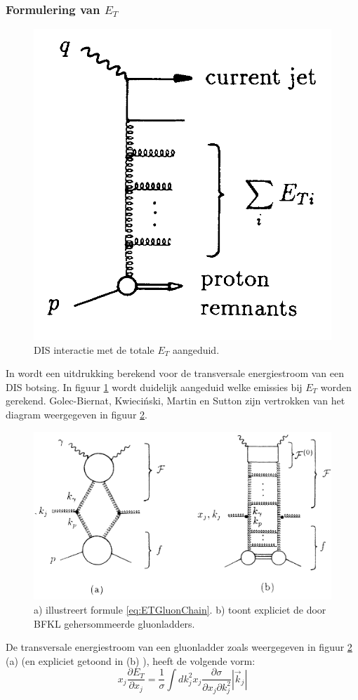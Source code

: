 \documentclass[a4paper,11pt]{article}
\numberwithin{equation}{section} %
\begin{document}
    \subsubsection{Formulering van $E_T$}
\begin{figure} [H]
  \begin{center}
    \includegraphics[width=.33\textwidth]{Afbeeldingen/ETDefinitionDiagram.png}
    \caption{DIS interactie met de totale $E_T$ aangeduid. \cite{ET}}
   \label{fig:ETDefinitionDiagram}
  \end{center}
\end{figure}
In \cite{ET} wordt een uitdrukking berekend voor de transversale energiestroom van een DIS botsing.
In figuur \ref{fig:ETDefinitionDiagram} wordt duidelijk aangeduid welke emissies bij $E_T$ worden gerekend.
Golec-Biernat, Kwieciński, Martin en Sutton zijn vertrokken van het diagram weergegeven in figuur \ref{fig:ETDiagram}.
\begin{figure} [H]
  \begin{center}
    \includegraphics[width=.66\textwidth]{Afbeeldingen/ETDiagram.png}
    \caption{a) illustreert formule \eqref{eq:ETGluonChain}. b) toont expliciet de door BFKL gehersommeerde gluonladders. \cite{ET}}
   \label{fig:ETDiagram}
  \end{center}
\end{figure}
De transversale energiestroom van een gluonladder zoals weergegeven in figuur \ref{fig:ETDiagram} (a) (en expliciet getoond in (b) ), heeft de volgende vorm:
\begin{equation} \label{eq:ETGluonChain}
x_j \frac{\partial E_T}{\partial x_j} = \frac{1}{\sigma} \int dk_j^2 x_j \frac{\partial \sigma}{\partial x_j \partial k_j^2} |\vec{k}_j|
\end{equation}
\end{document}
